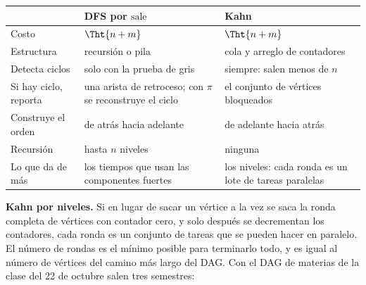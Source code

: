 \documentclass[11pt,letterpaper]{article}
\begin{document}
\begin{center}
\small
\begin{tabular}{>{\raggedright\arraybackslash}p{3.1cm}
                >{\raggedright\arraybackslash}p{5.6cm}
                >{\raggedright\arraybackslash}p{5.6cm}}
  \toprule
  & \textbf{DFS por $\text{sale}$} & \textbf{Kahn} \\
  \midrule
  Costo & $\Tht{n + m}$ & $\Tht{n + m}$ \\
  Estructura & recursión o pila & cola y arreglo de contadores \\
  Detecta ciclos & solo con la prueba de gris & siempre: salen menos
    de $n$ \\
  Si hay ciclo, reporta & una arista de retroceso; con $\pi$ se
    reconstruye el ciclo & el conjunto de vértices bloqueados \\
  Construye el orden & de atrás hacia adelante & de adelante hacia
    atrás \\
  Recursión & hasta $n$ niveles & ninguna \\
  Lo que da de más & los tiempos que usan las componentes fuertes &
    los niveles: cada ronda es un lote de tareas paralelas \\
  \bottomrule
\end{tabular}
\end{center}

\textbf{Kahn por niveles.} Si en lugar de sacar un vértice a la vez se
saca la ronda completa de vértices con contador cero, y solo después
se decrementan los contadores, cada ronda es un conjunto de tareas que
se pueden hacer en paralelo. El número de rondas es el mínimo posible
para terminarlo todo, y es igual al número de vértices del camino más
largo del DAG. Con el DAG de materias de la clase del 22 de octubre
salen tres semestres:

\begin{center}
\end{center}
\end{document}

